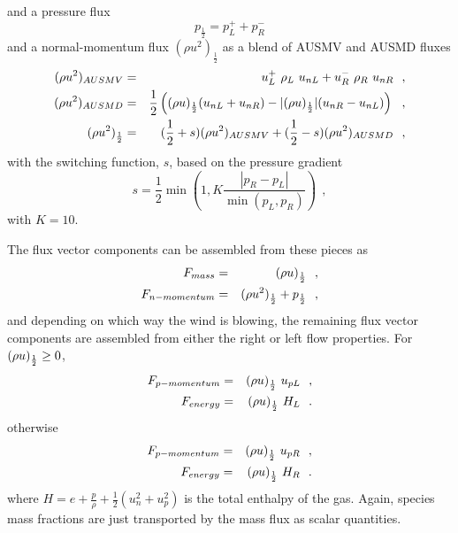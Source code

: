 and a pressure flux
\begin{equation}
 p_\frac{1}{2} =  p_L^+ + p_R^-  
\end{equation}
and a normal-momentum flux $(\rho u^2)_\frac{1}{2}$ as a blend of AUSMV and AUSMD fluxes
\begin{eqnarray}
  (\rho u^2)_{AUSMV} & = & u_L^+ ~ \rho_L ~ u_{nL} + u_R^- ~ \rho_R ~ u_{nR}~~, \nonumber \\
  (\rho u^2)_{AUSMD} & = & \frac{1}{2} \left( (\rho u)_\frac{1}{2} (u_{nL} + u_{nR}) - |(\rho u)_\frac{1}{2}| (u_{nR} - u_{nL}) \right)~~, \nonumber \\
  (\rho u^2)_\frac{1}{2} & = & (\frac{1}{2} + s) (\rho u^2)_{AUSMV} + (\frac{1}{2} - s) (\rho u^2)_{AUSMD} ~~,
\end{eqnarray}
with the switching function, $s$,  based on the pressure gradient
\begin{equation}
  s = \frac{1}{2} \min \left( 1, K \frac{|p_R - p_L|}{\min(p_L, p_R)} \right) ~~,
\end{equation}
with $K = 10$.

\medskip
The flux vector components can be assembled from these pieces as
\begin{eqnarray}
 F_{mass} & = & (\rho u)_\frac{1}{2} ~~, \nonumber \\
 F_{n-momentum} & = & (\rho u^2)_\frac{1}{2} + p_\frac{1}{2} ~~,
\end{eqnarray}
and depending on which way the wind is blowing, 
the remaining flux vector components are assembled from either the right or left flow properties.
For $(\rho u)_\frac{1}{2} \ge 0$, 
\begin{eqnarray}
 F_{p-momentum} & = & (\rho u)_\frac{1}{2} ~ u_{pL} ~~, \nonumber \\
 F_{energy} & = & (\rho u)_\frac{1}{2} ~ H_L ~~. \\
\end{eqnarray}
otherwise
\begin{eqnarray}
 F_{p-momentum} & = & (\rho u)_\frac{1}{2} ~ u_{pR} ~~, \nonumber \\
 F_{energy} & = & (\rho u)_\frac{1}{2} ~ H_R ~~. \\
\end{eqnarray}
where $H = e + \frac{p}{\rho} + \frac{1}{2} \left( u_{n}^2 + u_{p}^2 \right)$ is the total enthalpy
of the gas.
Again, species mass fractions are just transported by the mass flux as scalar quantities.


